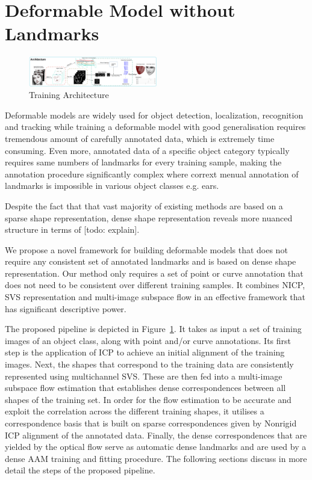 \section{Deformable Model without Landmarks}

\begin{figure}[h!]
    \centering
        \includegraphics[width=0.5\textwidth]{resources/architecture}
    \caption{Training Architecture}
    \label{fig:archi}
\end{figure}

Deformable models are widely used for object detection, localization, recognition and tracking while training a deformable model with good generalisation requires tremendous amount of carefully annotated data, which is extremely time consuming. Even more, annotated data of a specific object category typically requires same numbers of landmarks for every training sample, making the annotation procedure significantly complex where corrext menual annotation of landmarks is impossible in various object classes e.g. ears.

Despite the fact that that vast majority of existing methods are based on a sparse shape representation, dense shape representation reveals more nuanced structure in terms of [todo: explain].

We propose a novel framework for building deformable models that does not require any consistent set of annotated landmarks and is based on dense shape representation. Our method only requires a set of point or curve annotation that does not need to be consistent over different training samples. It combines NICP, SVS representation and multi-image subspace flow in an effective framework that has significant descriptive power.

The proposed pipeline is depicted in Figure~\ref{fig:archi}. It takes as input a set of training images of an object class, along with point and/or curve annotations. Its first step is the application of ICP to achieve an initial alignment of the training images. Next, the shapes that correspond to the training data are consistently represented using multichannel SVS. These are then fed into a multi-image subspace flow estimation that establishes dense correspondences between all shapes of the training set. In order for the flow estimation to be accurate and exploit the correlation across the different training shapes, it utilises a correspondence basis that is built on sparse correspondences given by Nonrigid ICP alignment of the annotated data. Finally, the dense correspondences that are yielded by the optical flow serve as automatic dense landmarks and are used by a dense AAM training and fitting procedure. The following sections discuss in more detail the steps of the proposed pipeline.


